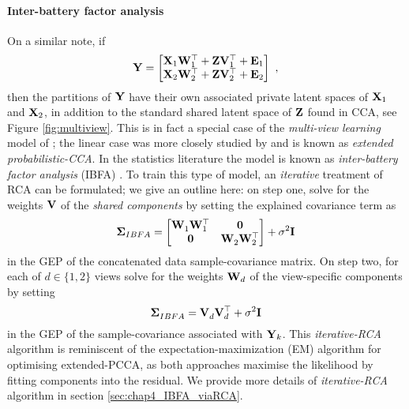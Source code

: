       \paragraph{Inter-battery factor analysis} On a similar note, if
      \begin{equation*}
	\mathbf{Y}
	= \begin{bmatrix}  \mathbf{X}_1\mathbf{W}_1^\top + \mathbf{Z}\mathbf{V}_1^\top + \mathbf{E}_1 \\ \mathbf{X}_2\mathbf{W}_2^\top + \mathbf{Z}\mathbf{V}_2^\top + \mathbf{E}_2  \end{bmatrix} ~,
      \end{equation*}
      then the partitions of $\mathbf{Y}$ have their own associated private latent spaces of $\mathbf{X}_{1}$ and $\mathbf{X}_{2}$, in addition to the standard shared latent space of $\mathbf{Z}$ found in CCA, see Figure \ref{fig:multiview}. This is in fact a special case of the \textit{multi-view learning} model of \citet{Ek:ambiguity08}; the linear case was more closely studied by \citet{Klami:dependencies08,Klami:generative06} and is known as \textit{extended probabilistic-CCA}. In the statistics literature the model is known as \textit{inter-battery factor analysis} (IBFA) \citep{Tucker:interbattery58, Browne:maximum79}.
      To train this type of model, an \textit{iterative} treatment of RCA can be formulated;
      we give an outline here: on step one, solve for the weights $\mathbf{V}$ of the \textit{shared components} by setting the explained covariance term as
      \[
	\mathbf{\Sigma}_{IBFA} = \begin{bmatrix}  \mathbf{W}^{~}_1 \mathbf{W}_1^\top & \mathbf{0} \\ \mathbf{0} & \mathbf{W}^{~}_2\mathbf{W}_2^\top  \end{bmatrix} + \sigma^2\mathbf{I}
      \]
      in the GEP of the concatenated data sample-covariance matrix. On step two, for each of $d \in \{1,2\}$ views solve for the weights $\mathbf{W}_d$ of the view-specific components by setting
      \[
	\mathbf{\Sigma}_{IBFA}^{~} = \mathbf{V}_d^{~} \mathbf{V}_d^\top + \sigma^2\mathbf{I}
      \]
      in the GEP of the sample-covariance associated with $\mathbf{Y}_k$. This \textit{iterative-RCA} algorithm is reminiscent of the expectation-maximization (EM) algorithm for optimising extended-PCCA, as both approaches maximise the likelihood by fitting components into the residual. We provide more details of \textit{iterative-RCA} algorithm in section \ref{sec:chap4_IBFA_viaRCA}.

